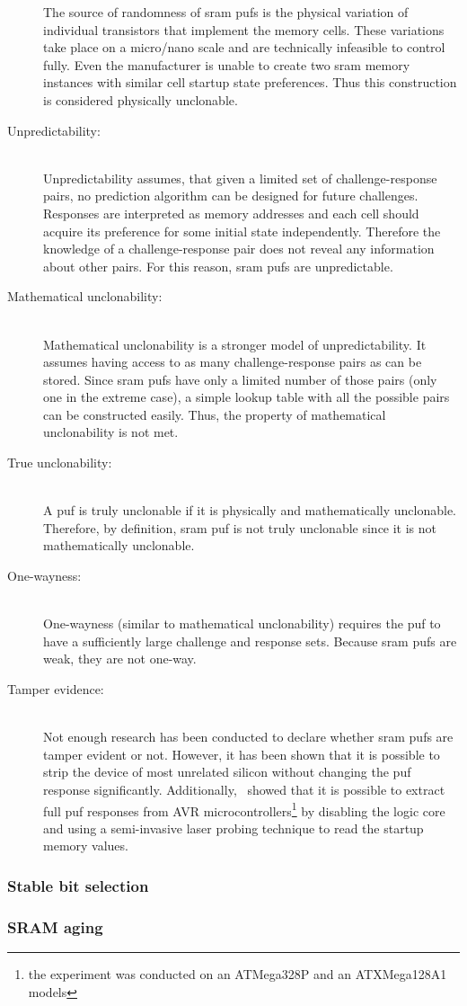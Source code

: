 \begin{description}
        The source of randomness of \gls{sram} \glspl{puf} is the physical variation of individual transistors that implement the memory cells. These variations take place on a micro/nano scale and are technically infeasible to control fully. Even the manufacturer is unable to create two \gls{sram} memory instances with similar cell startup state preferences. Thus this construction is considered physically unclonable.
    \item[Unpredictability:] \hfill \\
        Unpredictability assumes, that given a limited set of challenge-response pairs, no prediction algorithm can be designed for future challenges. Responses are interpreted as memory addresses and each cell should acquire its preference for some initial state independently. Therefore the knowledge of a challenge-response pair does not reveal any information about other pairs. For this reason, \gls{sram} \glspl{puf} are unpredictable. %
    \item[Mathematical unclonability:] \hfill \\
        Mathematical unclonability is a stronger model of unpredictability. It assumes having access to as many challenge-response pairs as can be stored. Since \gls{sram} \glspl{puf} have only a limited number of those pairs (only one in the extreme case), a simple lookup table with all the possible pairs can be constructed easily. Thus, the property of mathematical unclonability is not met.
    \item[True unclonability:] \hfill \\
        A \gls{puf} is truly unclonable if it is physically and mathematically unclonable. Therefore, by definition, \gls{sram} \gls{puf} is not truly unclonable since it is not mathematically unclonable.
    \item[One-wayness:] \hfill \\
        One-wayness (similar to mathematical unclonability) requires the \gls{puf} to have a sufficiently large challenge and response sets. Because \gls{sram} \glspl{puf} are weak, they are not one-way.
    \item[Tamper evidence:] \hfill \\
        Not enough research has been conducted to declare whether \gls{sram} \glspl{puf} are tamper evident or not\cite{Maes2012}. However, it has been shown that it is possible to strip the device of most unrelated silicon without changing the \gls{puf} response significantly\cite{Helfmaier2013}. Additionally,~\cite{Nedospasov2013} showed that it is possible to extract full \gls{puf} responses from AVR microcontrollers\footnote{the experiment was conducted on an ATMega328P and an ATXMega128A1 models} by disabling the logic core and using a semi-invasive laser probing technique to read the startup memory values.
\end{description}


\subsubsection*{Stable bit selection}

\subsubsection*{SRAM aging}


